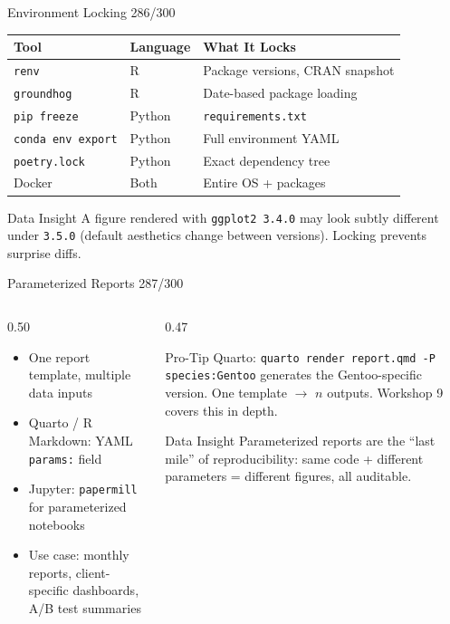 \documentclass[10pt]{beamer}
\newcommand{\smark}[1]{\hfill{\scriptsize\color{codegray}#1}}
\begin{document}
\begin{frame}{Environment Locking}
\smark{286/300}
\centering\small
\begin{tabular}{@{}lll@{}}
    \toprule
    \textbf{Tool} & \textbf{Language} & \textbf{What It Locks} \\
    \midrule
    \texttt{renv}           & R      & Package versions, CRAN snapshot \\
    \texttt{groundhog}      & R      & Date-based package loading \\
    \texttt{pip freeze}     & Python & \texttt{requirements.txt} \\
    \texttt{conda env export}& Python & Full environment YAML \\
    \texttt{poetry.lock}    & Python & Exact dependency tree \\
    Docker                  & Both   & Entire OS + packages \\
    \bottomrule
\end{tabular}

\vspace{0.3cm}
\begin{exampleblock}{Data Insight}
    \scriptsize A figure rendered with \texttt{ggplot2 3.4.0} may look subtly different under \texttt{3.5.0} (default aesthetics change between versions). Locking prevents surprise diffs.
\end{exampleblock}
\end{frame}

\begin{frame}{Parameterized Reports}
\smark{287/300}
\begin{columns}[T]
\begin{column}{0.50\textwidth}
\begin{itemize}
    \item One report template, multiple data inputs
    \item Quarto / R Markdown: YAML \texttt{params:} field
    \item Jupyter: \texttt{papermill} for parameterized notebooks
    \item Use case: monthly reports, client-specific dashboards, A/B test summaries
\end{itemize}
\end{column}
\begin{column}{0.47\textwidth}
\begin{alertblock}{Pro-Tip}
    \scriptsize Quarto: \texttt{quarto render report.qmd -P species:Gentoo} generates the Gentoo-specific version. One template $\to$ $n$ outputs. Workshop 9 covers this in depth.
\end{alertblock}
\vspace{0.2cm}
\begin{exampleblock}{Data Insight}
    \scriptsize Parameterized reports are the ``last mile'' of reproducibility: same code + different parameters = different figures, all auditable.
\end{exampleblock}
\end{column}
\end{columns}
\end{frame}
\end{document}
